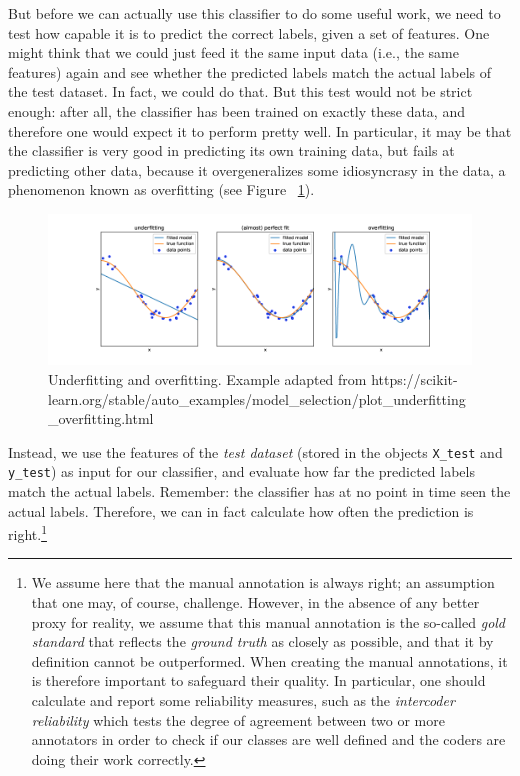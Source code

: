 But before we can actually use this classifier to do some useful work, we need to test how capable it  is to predict the
correct labels, given a set of features. One might think that we could
just feed it the same input data (i.e., the same features) again and
see whether the predicted labels match the actual labels of the test
dataset.  In fact, we could do that.  But this test would not be
strict enough: after all, the classifier has been trained on exactly
these data, and therefore one would expect it to perform pretty well.
In particular, it may be that the classifier is very good in
predicting its own training data, but fails at predicting other data,
because it overgeneralizes some idiosyncrasy in the data, a phenomenon
known as overfitting (see Figure ~\ref{fig:overfit}).

\begin{figure}
\centering
\includegraphics[width=\linewidth]{figures/ch09_overfitting}
\caption{Underfitting and overfitting. Example adapted from https://scikit-learn.org/stable/auto\_examples/model\_selection/plot\_underfitting\_overfitting.html}
\label{fig:overfit}
\end{figure}

Instead, we use the features of the \emph{test dataset} (stored in the objects  \texttt{X\_test} and \texttt{y\_test})  as input for
our classifier, and evaluate  how far the predicted labels match the
actual labels.  Remember: the classifier has at no point in time seen
the actual labels.  Therefore, we can in fact calculate how often the
prediction is right.\footnote{We assume here that the manual annotation
  is always right; an assumption that one may, of course,
  challenge. However, in the absence of any better proxy for reality,
  we assume that this manual annotation is the so-called \emph{gold
    standard} that reflects the \emph{ground truth} as closely as
  possible, and that it by definition cannot be outperformed. When creating the manual annotations, it is therefore important to safeguard their quality. In particular, one  should calculate and report some reliability measures, such as the \emph{intercoder reliability} which tests the degree of agreement between two or more annotators in order to check if our classes are well defined and the coders are doing their work correctly.}

